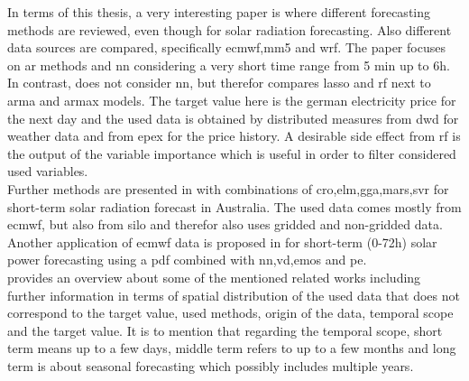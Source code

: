 In terms of this thesis, a very interesting paper is  where different forecasting methods are reviewed, even though for solar radiation forecasting. Also different data sources are compared, specifically \gls{ecmwf},\gls{mm5} and \gls{wrf}. The paper focuses on \gls{ar} methods and \gls{nn} considering a very short time range from 5 min up to 6h.\\
In contrast,  does not consider \gls{nn}, but therefor compares \gls{lasso} and \gls{rf} next to \gls{arma} and \gls{armax} models. The target value here is the german electricity price for the next day and the used data is obtained by distributed measures from \gls{dwd} for weather data and from \gls{epex} for the price history. A desirable side effect from \gls{rf} is the output of the variable importance which is useful in order to filter considered used variables.\\
Further methods are presented in  with combinations of \gls{cro},\gls{elm},\gls{gga},\gls{mars},\gls{svr} for short-term solar radiation forecast in Australia. The used data comes mostly from \gls{ecmwf}, but also from \gls{silo} and therefor also uses gridded and non-gridded data.\\
Another application of \gls{ecmwf} data is proposed in  for short-term (0-72h) solar power forecasting using a \gls{pdf} combined with \gls{nn},\gls{vd},\gls{emos} and \gls{pe}.\\

 provides an overview about some of the mentioned related works including further information in terms of spatial distribution of the used data that does not correspond to the target value, used methods, origin of the data, temporal scope and the target value. It is to mention that regarding the temporal scope, short term means up to a few days, middle term refers to up to a few months and long term is about seasonal forecasting which possibly includes multiple years.\\

